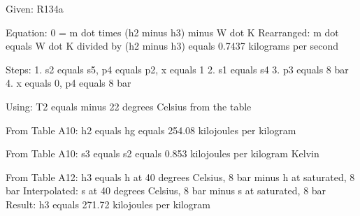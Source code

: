 Given: R134a  

Equation:  
0 = m dot times (h2 minus h3) minus W dot K  
Rearranged:  
m dot equals W dot K divided by (h2 minus h3) equals 0.7437 kilograms per second  

Steps:  
1. s2 equals s5, p4 equals p2, x equals 1  
2. s1 equals s4  
3. p3 equals 8 bar  
4. x equals 0, p4 equals 8 bar  

Using:  
T2 equals minus 22 degrees Celsius from the table  

From Table A10:  
h2 equals hg equals 254.08 kilojoules per kilogram  

From Table A10:  
s3 equals s2 equals 0.853 kilojoules per kilogram Kelvin  

From Table A12:  
h3 equals h at 40 degrees Celsius, 8 bar minus h at saturated, 8 bar  
Interpolated:  
s at 40 degrees Celsius, 8 bar minus s at saturated, 8 bar  
Result:  
h3 equals 271.72 kilojoules per kilogram